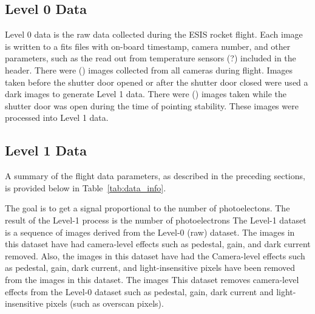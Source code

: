     \subsection{Level 0 Data}
	    Level 0 data is the raw data collected during the ESIS rocket flight.  
	    Each image is written to a fits files with on-board timestamp, camera number, and other parameters, such as the read out from temperature sensors (?) included in the header.  There were () images collected from all cameras during flight.  
	    Images taken before the shutter door opened or after the shutter door closed were used a dark images to generate Level 1 data.  
	    There were () images taken while the shutter door was open during the time of pointing stability.  
	    These images were processed into Level 1 data.  

    
    \subsection{Level 1 Data}
	    
  
    
    	
    	
    	A summary of the flight data parameters, as described in the preceding sections, is provided below in Table~\ref{tab:data_info}. 
    	
        The goal is to get a signal proportional to the number of photoelectons. 
        The result of the Level-1 process is the number of photoelectrons 
        The Level-1 dataset is a sequence of images derived from the Level-0 (raw) dataset.
        The images in this dataset have had camera-level effects such as pedestal, gain, and dark current removed.
        Also, the images in this dataset have had the 
        Camera-level effects such as pedestal, gain, dark current, and light-insensitive pixels have been removed from the images in this dataset.
        The images 
        This dataset removes camera-level effects from the Level-0 dataset such as pedestal, gain, dark current and light-insensitive pixels (such as overscan pixels).
        

